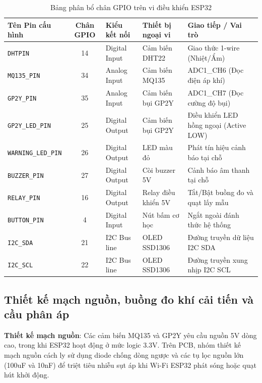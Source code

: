 \begin{table}[H]
\centering
\caption{Bảng phân bổ chân GPIO trên vi điều khiển ESP32}
\label{tab:gpioallocation}
\begin{small}
\begin{tabular}{lcllp{6.5cm}}
\toprule
\textbf{Tên Pin cấu hình} & \textbf{Chân GPIO} & \textbf{Kiểu kết nối} & \textbf{Thiết bị ngoại vi} & \textbf{Giao tiếp / Vai trò} \\
\midrule
\texttt{DHTPIN} & 14 & Digital Input & Cảm biến DHT22 & Giao thức 1-wire (Nhiệt/Ẩm) \\
\texttt{MQ135\_PIN} & 34 & Analog Input & Cảm biến MQ135 & ADC1\_CH6 (Đọc điện áp khí) \\
\texttt{GP2Y\_PIN} & 35 & Analog Input & Cảm biến bụi GP2Y & ADC1\_CH7 (Đọc cường độ bụi) \\
\texttt{GP2Y\_LED\_PIN} & 25 & Digital Output & Cảm biến bụi GP2Y & Điều khiển LED hồng ngoại (Active LOW) \\
\texttt{WARNING\_LED\_PIN} & 26 & Digital Output & LED màu đỏ & Phát tín hiệu cảnh báo tại chỗ \\
\texttt{BUZZER\_PIN} & 27 & Digital Output & Còi buzzer 5V & Cảnh báo âm thanh tại chỗ \\
\texttt{RELAY\_PIN} & 16 & Digital Output & Relay điều khiển 5V & Tắt/Bật buồng đo và quạt lấy mẫu \\
\texttt{BUTTON\_PIN} & 4 & Digital Input & Nút bấm cơ học & Ngắt ngoài đánh thức hệ thống \\
\texttt{I2C\_SDA} & 21 & I2C Bus line & OLED SSD1306 & Đường truyền dữ liệu I2C SDA \\
\texttt{I2C\_SCL} & 22 & I2C Bus line & OLED SSD1306 & Đường truyền xung nhịp I2C SCL \\
\bottomrule
\end{tabular}
\end{small}
\end{table}

\subsection{Thiết kế mạch nguồn, buồng đo khí cải tiến và cầu phân áp}
\textbf{Thiết kế mạch nguồn}: Các cảm biến MQ135 và GP2Y yêu cầu nguồn 5V dòng cao, trong khi ESP32 hoạt động ở mức logic 3.3V. Trên PCB, nhóm thiết kế mạch nguồn cách ly sử dụng diode chống dòng ngược và các tụ lọc nguồn lớn (100uF và 10nF) để triệt tiêu nhiễu sụt áp khi Wi-Fi ESP32 phát sóng hoặc quạt hút khởi động.

